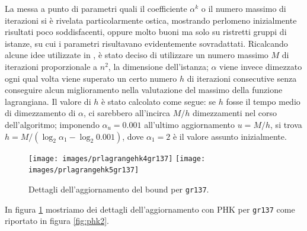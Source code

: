La messa a punto di parametri quali il coefficiente $\alpha^k$ o il numero massimo di iterazioni si è rivelata particolarmente ostica, mostrando perlomeno inizialmente risultati poco soddisfacenti, oppure molto buoni ma solo su ristretti gruppi di istanze, su cui i parametri risultavano evidentemente sovradattati. Ricalcando alcune idee utilizzate in \citep{volgenant1982branch}, è stato deciso di utilizzare un numero massimo $M$ di iterazioni proporzionale a $n^2$, la dimensione dell'istanza; $\alpha$ viene invece dimezzato ogni qual volta viene superato un certo numero $h$ di iterazioni consecutive senza conseguire alcun miglioramento nella valutazione del massimo della funzione lagrangiana. Il valore di $h$ è stato calcolato come segue: se $h$ fosse il tempo medio di dimezzamento di $\alpha$, ci sarebbero all'incirca $M/h$ dimezzamenti nel corso dell'algoritmo; imponendo $\alpha_u = 0.001$ all'ultimo aggiornamento $u = M/h$, si trova $h = M / (\log_2{\alpha_1} - \log_2{0.001})$, dove $\alpha_1 = 2$ è il valore assunto inizialmente.

\begin{figure}
  \begin{center}
    \texttt{[image: images/prlagrangehk4gr137]}
    \texttt{[image: images/prlagrangehk5gr137]}
    \caption{Dettagli dell'aggiornamento del bound per \texttt{gr137}.}
    \label{fig:phkdettagli}
  \end{center}
\end{figure}

In figura \ref{fig:phkdettagli} mostriamo dei dettagli dell'aggiornamento con PHK per \texttt{gr137} come riportato in figura \ref{fig:phk2}.


